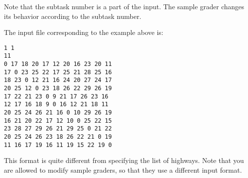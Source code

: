 Note that the subtask number is a part of the input. The sample grader changes its behavior according to the subtask number.

The input file corresponding to the example above is:

\begin{verbatim}
1 1
11
0 17 18 20 17 12 20 16 23 20 11
17 0 23 25 22 17 25 21 28 25 16
18 23 0 12 21 16 24 20 27 24 17
20 25 12 0 23 18 26 22 29 26 19
17 22 21 23 0 9 21 17 26 23 16
12 17 16 18 9 0 16 12 21 18 11
20 25 24 26 21 16 0 10 29 26 19
16 21 20 22 17 12 10 0 25 22 15
23 28 27 29 26 21 29 25 0 21 22
20 25 24 26 23 18 26 22 21 0 19
11 16 17 19 16 11 19 15 22 19 0
\end{verbatim}

This format is quite different from specifying the list of highways. Note that you are allowed to modify sample graders, so that they use a different input format.